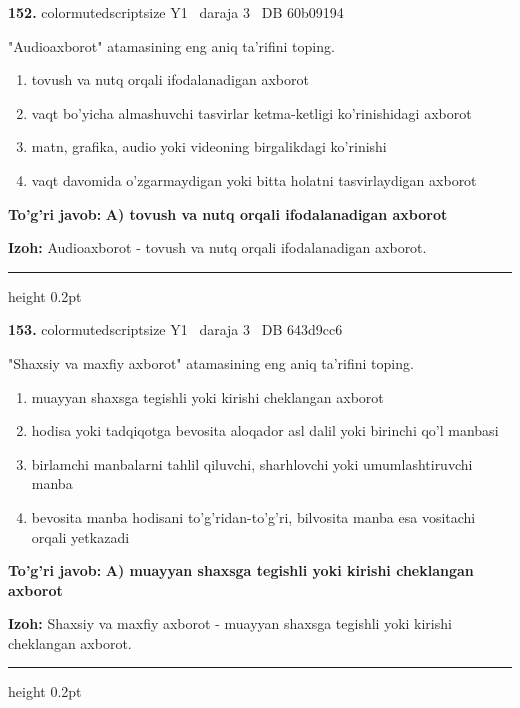 \documentclass[10pt,a4paper,oneside]{article}
\begin{document}
\noindent\textbf{\color{ink}152.}  {color{muted}scriptsize Y1 \textbullet\ daraja 3 \textbullet\ DB 60b09194}
\par
"Audioaxborot" atamasining eng aniq ta'rifini toping.
\begin{enumerate}[label=\Alph*),leftmargin=9mm]
\item tovush va nutq orqali ifodalanadigan axborot
\item vaqt bo'yicha almashuvchi tasvirlar ketma-ketligi ko'rinishidagi axborot
\item matn, grafika, audio yoki videoning birgalikdagi ko'rinishi
\item vaqt davomida o'zgarmaydigan yoki bitta holatni tasvirlaydigan axborot
\end{enumerate}
\begin{tcolorbox}[enhanced,breakable,colback=teal!4,colframe=teal!50!black,boxrule=0.5pt,arc=1.1mm,left=3mm,right=3mm,top=1.7mm,bottom=1.7mm,before skip=2mm,after skip=2mm]
\textbf{\color{teal}To'g'ri javob:} \textbf{A) tovush va nutq orqali ifodalanadigan axborot}
\par\smallskip
\textbf{Izoh:} Audioaxborot - tovush va nutq orqali ifodalanadigan axborot.
\end{tcolorbox}
\vspace{2mm}\hrule height 0.2pt \vspace{3mm}

\noindent\textbf{\color{ink}153.}  {color{muted}scriptsize Y1 \textbullet\ daraja 3 \textbullet\ DB 643d9cc6}
\par
"Shaxsiy va maxfiy axborot" atamasining eng aniq ta'rifini toping.
\begin{enumerate}[label=\Alph*),leftmargin=9mm]
\item muayyan shaxsga tegishli yoki kirishi cheklangan axborot
\item hodisa yoki tadqiqotga bevosita aloqador asl dalil yoki birinchi qo'l manbasi
\item birlamchi manbalarni tahlil qiluvchi, sharhlovchi yoki umumlashtiruvchi manba
\item bevosita manba hodisani to'g'ridan-to'g'ri, bilvosita manba esa vositachi orqali yetkazadi
\end{enumerate}
\begin{tcolorbox}[enhanced,breakable,colback=teal!4,colframe=teal!50!black,boxrule=0.5pt,arc=1.1mm,left=3mm,right=3mm,top=1.7mm,bottom=1.7mm,before skip=2mm,after skip=2mm]
\textbf{\color{teal}To'g'ri javob:} \textbf{A) muayyan shaxsga tegishli yoki kirishi cheklangan axborot}
\par\smallskip
\textbf{Izoh:} Shaxsiy va maxfiy axborot - muayyan shaxsga tegishli yoki kirishi cheklangan axborot.
\end{tcolorbox}
\vspace{2mm}\hrule height 0.2pt \vspace{3mm}
\end{document}

